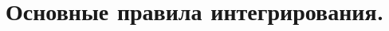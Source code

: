 \documentclass[../main.tex]{subfiles}
\begin{document}
\chapter{Основные правила интегрирования.}

\end{document}
